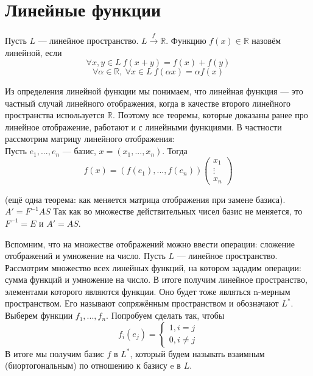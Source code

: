 \documentclass[11pt]{article}
\begin{document}
\section{Линейные функции}

\begin{definition}
    Пусть $L$ --- линейное пространство. $L \xrightarrow{f} \mathbb{R}$. Функцию $f(x)\in \mathbb{R}$ назовём линейной, если
    \[ \forall x,y\in L \ f(x+y) = f(x) + f(y) \]
    \[ \forall \alpha\in \mathbb{R}, \ \forall x\in L \ f(\alpha x) = \alpha f(x) \]
\end{definition}

\begin{remark}
    Из определения линейной функции мы понимаем, что линейная функция --- это частный случай линейного отображения, когда в качестве второго линейного пространства используется $\mathbb{R}$.
    Поэтому все теоремы, которые доказаны ранее про линейное отображение, работают и с линейными функциями. В частности рассмотрим матрицу линейного отображения:\\
    Пусть $e_1, ..., e_n$ --- базис, $x = (x_1,...,x_n)$. Тогда 
    \[ f(x) = (f(e_1), ... , f(e_n)) 
    \begin{pmatrix}
        x_1 \\
        \vdots \\
        x_n
    \end{pmatrix} \] 

\end{remark}

\begin{remark}
    (ещё одна теорема: как меняется матрица отображения при замене базиса). $A' = F^{-1}AS $
    Так как во множестве действительных чисел базис не меняется, то $F^{-1}= E$ и $A'= AS$.

\end{remark}


\begin{definition}
    Вспомним, что на множестве отображений можно ввести операции: сложение отображений и умножение на число. Пусть $L$ --- линейное пространство. Рассмотрим
    множество всех линейных функций, на котором зададим операции: сумма функций и умножение на число. В итоге получим линейное пространство, элементами которого являются функции. 
    Оно будет тоже являться n-мерным пространством. Его называют сопряжённым пространством и обозначают $L^*$.
    Выберем функции $f_1, ... , f_n$. Попробуем сделать так, чтобы 
    \[ f_i(e_j) = 
    \begin{cases}
        1, i=j\\
        0, i\neq j
    \end{cases} \]
    В итоге мы получим базис $f$ в $L^*$, который будем называть взаимным (биортогональным) по отношению к базису e в $L$.
\end{definition}
\end{document}

